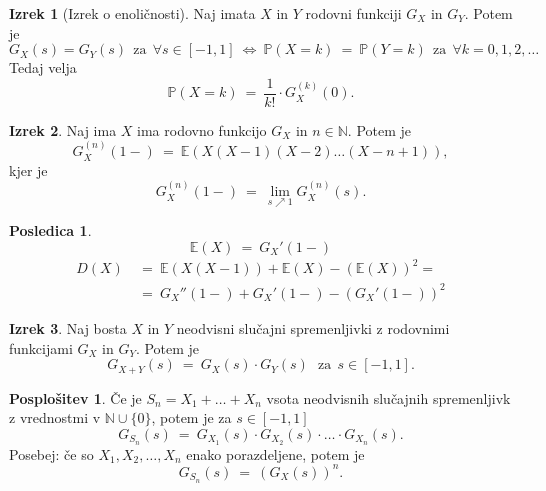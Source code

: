 \documentclass[11pt]{article}
\theoremstyle{definition}
\theoremstyle{definition}
\theoremstyle{definition}
\newtheorem{izrek}{Izrek}[section]
\newtheorem*{posledica}{Posledica}
\newtheorem*{posplošitev}{Posplošitev}
\begin{document}
\begin{izrek}[Izrek o enoličnosti]

Naj imata $X$ in $Y$ rodovni funkciji $G_X$ in $G_Y$. Potem je
$$G_X(s) = G_Y(s) ~~\text{za}~~ \forall s \in [-1, 1] ~\iff~ \mathbb{P}(X=k) ~=~ \mathbb{P}(Y=k) ~~\text{za}~~ \forall k = 0, 1, 2, \ldots $$
Tedaj velja
$$\mathbb{P}(X = k) ~=~ \frac{1}{k!} \cdot G_X^{(k)}(0).$$

\end{izrek}
\vspace{0.5cm}

\begin{izrek}

Naj ima $X$ ima rodovno funkcijo $G_X$ in $n \in \mathbb{N}$. Potem je 
$$G_X^{(n)}(1-) ~=~ \mathbb{E}(X(X-1)(X-2)\ldots(X-n+1)),$$
kjer je 
$$G_X^{(n)}(1-) ~=~ \lim_{s \nearrow 1} G_X^{(n)}(s).$$

\end{izrek}
\vspace{0.5cm}

\begin{posledica}

$$\mathbb{E}(X) ~=~ G_X'(1-)$$
\begin{align*}
	D(X) ~&=~ \mathbb{E}(X(X-1)) + \mathbb{E}(X) - (\mathbb{E}(X))^2 = \\
	&=~ G_X''(1-) + G_X'(1-) - (G_X'(1-))^2
\end{align*}

\end{posledica}
\vspace{0.5cm}

\begin{izrek}

Naj bosta $X$ in $Y$ neodvisni slučajni spremenljivki z rodovnimi funkcijami $G_X$ in $G_Y$. Potem je 
$$G_{X+Y}(s) ~=~ G_X(s) \cdot G_Y(s) ~~~\text{za}~~ s \in [-1, 1].$$

\end{izrek}
\vspace{0.5cm}

\begin{posplošitev}

Če je $S_n = X_1 + \ldots + X_n$ vsota neodvisnih slučajnih spremenljivk z vrednostmi v $\mathbb{N} \cup \{0\}$, potem je za $s \in [-1, 1]$
$$G_{S_n}(s) ~=~ G_{X_1}(s) \cdot G_{X_2}(s) \cdot \ldots \cdot G_{X_n}(s).$$
Posebej: če so $X_1, X_2, \ldots, X_n$ enako porazdeljene, potem je
$$G_{S_n}(s) ~=~ (G_X(s))^n.$$ 

\end{posplošitev}
\vspace{0.5cm}
\end{document}
